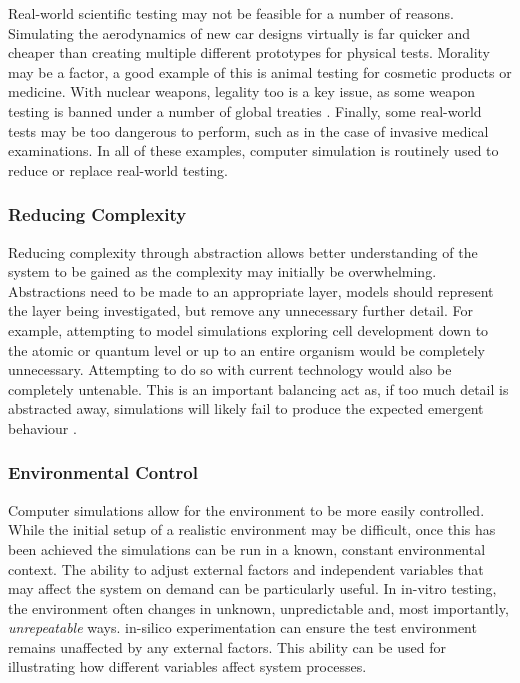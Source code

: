 \documentclass{UoYCSproject}
\begin{document}
Real-world scientific testing may not be feasible for a number of reasons.
Simulating the aerodynamics of new car designs virtually is far quicker and cheaper than creating multiple different prototypes for physical tests.
Morality may be a factor, a good example of this is animal testing for cosmetic products or medicine.
With nuclear weapons, legality too is a key issue, as some weapon testing is banned under a number of global treaties \cite{partial_nuclear_test_ban_treaty, threshold_test_ban_treaty}.
Finally, some real-world tests may be too dangerous to perform, such as in the case of invasive medical examinations.
In all of these examples, computer simulation is routinely used to reduce or replace real-world testing.

\subsubsection{Reducing Complexity}
Reducing complexity through abstraction allows better understanding of the system to be gained as the complexity may initially be overwhelming.
Abstractions need to be made to an appropriate layer, models should represent the layer being investigated, but remove any unnecessary further detail.
For example, attempting to model simulations exploring cell development down to the atomic or quantum level or up to an entire organism would be completely unnecessary.
Attempting to do so with current technology would also be completely untenable.
This is an important balancing act as, if too much detail is abstracted away, simulations will likely fail to produce the expected emergent behaviour \cite{stepney_abm}.

\subsubsection{Environmental Control}
Computer simulations allow for the environment to be more easily controlled.
While the initial setup of a realistic environment may be difficult, once this has been achieved the simulations can be run in a known, constant environmental context.
The ability to adjust external factors and independent variables that may affect the system on demand can be particularly useful.
In \gls{in-vitro} testing, the environment often changes in unknown, unpredictable and, most importantly, \textit{unrepeatable} ways.
\Gls{in-silico} experimentation can ensure the test environment remains unaffected by any external factors.
This ability can be used for illustrating how different variables affect system processes.
\end{document}
